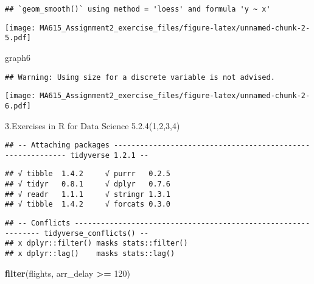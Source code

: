 \documentclass[]{article}
\newenvironment{Shaded}{\begin{snugshade}}{\end{snugshade}}
\newcommand{\KeywordTok}[1]{\textcolor[rgb]{0.13,0.29,0.53}{\textbf{#1}}}
\newcommand{\DecValTok}[1]{\textcolor[rgb]{0.00,0.00,0.81}{#1}}
\newcommand{\StringTok}[1]{\textcolor[rgb]{0.31,0.60,0.02}{#1}}
\newcommand{\CommentTok}[1]{\textcolor[rgb]{0.56,0.35,0.01}{\textit{#1}}}
\newcommand{\OperatorTok}[1]{\textcolor[rgb]{0.81,0.36,0.00}{\textbf{#1}}}
\newcommand{\NormalTok}[1]{#1}
\begin{document}
\begin{verbatim}
## `geom_smooth()` using method = 'loess' and formula 'y ~ x'
\end{verbatim}

\texttt{[image: MA615\_Assignment2\_exercise\_files/figure-latex/unnamed-chunk-2-5.pdf]}

\begin{Shaded}
\begin{Highlighting}[]
\NormalTok{graph6}
\end{Highlighting}
\end{Shaded}

\begin{verbatim}
## Warning: Using size for a discrete variable is not advised.
\end{verbatim}

\texttt{[image: MA615\_Assignment2\_exercise\_files/figure-latex/unnamed-chunk-2-6.pdf]}

3.Exercises in R for Data Science 5.2.4(1,2,3,4)

\begin{Shaded}
\end{Shaded}

\begin{verbatim}
## -- Attaching packages ----------------------------------------------------------- tidyverse 1.2.1 --
\end{verbatim}

\begin{verbatim}
## √ tibble  1.4.2     √ purrr   0.2.5
## √ tidyr   0.8.1     √ dplyr   0.7.6
## √ readr   1.1.1     √ stringr 1.3.1
## √ tibble  1.4.2     √ forcats 0.3.0
\end{verbatim}

\begin{verbatim}
## -- Conflicts -------------------------------------------------------------- tidyverse_conflicts() --
## x dplyr::filter() masks stats::filter()
## x dplyr::lag()    masks stats::lag()
\end{verbatim}

\begin{Shaded}
\begin{Highlighting}[]
\KeywordTok{filter}\NormalTok{(flights, arr_delay }\OperatorTok{>=}\StringTok{ }\DecValTok{120}\NormalTok{)}
\end{Highlighting}
\end{Shaded}
\end{document}
